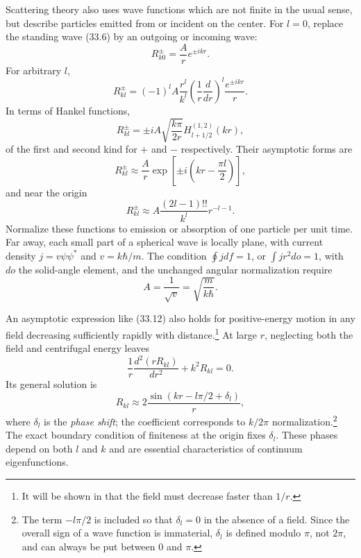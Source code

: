Scattering theory also uses wave functions which are not finite in the usual
sense, but describe particles emitted from or incident on the center. For
$l=0$, replace the standing wave (33.6) by an outgoing or incoming wave:
\begin{equation}R_{k0}^\pm=\frac Ar e^{\pm ikr}.\tag{33.14}\end{equation}
For arbitrary $l$,
\begin{equation}
 R_{kl}^\pm=(-1)^lA\frac{r^l}{k^l}\left(\frac1r\frac d{dr}\right)^l\frac{e^{\pm ikr}}r.
 \tag{33.15}
\end{equation}
In terms of Hankel functions,
\begin{equation}
 R_{kl}^\pm=\pm iA\sqrt{\frac{k\pi}{2r}}H_{l+1/2}^{(1,2)}(kr),\tag{33.16}
\end{equation}
of the first and second kind for $+$ and $-$ respectively. Their asymptotic
forms are
\begin{equation}
 R_{kl}^\pm\approx\frac Ar\exp\left[\pm i\left(kr-\frac{\pi l}2\right)\right],\tag{33.17}
\end{equation}
and near the origin
\begin{equation}R_{kl}^\pm\approx A\frac{(2l-1)!!}{k^l}r^{-l-1}.\tag{33.18}\end{equation}
Normalize these functions to emission or absorption of one particle per unit
time. Far away, each small part of a spherical wave is locally plane, with
current density $j=v\psi\psi^*$ and $v=k\hbar/m$. The condition
$\oint jdf=1$, or $\int jr^2do=1$, with $do$ the solid-angle element, and the
unchanged angular normalization require
\begin{equation}A=\frac1{\sqrt v}=\sqrt{\frac m{k\hbar}}.\tag{33.19}\end{equation}

An asymptotic expression like (33.12) also holds for positive-energy motion
in any field decreasing sufficiently rapidly with distance.\footnote{It will
be shown in  that the field must decrease faster than $1/r$.} At large
$r$, neglecting both the field and centrifugal energy leaves
\[\frac1r\frac{d^2(rR_{kl})}{dr^2}+k^2R_{kl}=0.\]
Its general solution is
\begin{equation}
 R_{kl}\approx2\frac{\sin(kr-l\pi/2+\delta_l)}r,\tag{33.20}
\end{equation}
where $\delta_l$ is the \emph{phase shift}; the coefficient corresponds to
$k/2\pi$ normalization.\footnote{The term $-l\pi/2$ is included so that
$\delta_l=0$ in the absence of a field. Since the overall sign of a wave
function is immaterial, $\delta_l$ is defined modulo $\pi$, not $2\pi$, and
can always be put between 0 and $\pi$.} The exact boundary condition of
finiteness at the origin fixes $\delta_l$. These phases depend on both $l$
and $k$ and are essential characteristics of continuum eigenfunctions.

